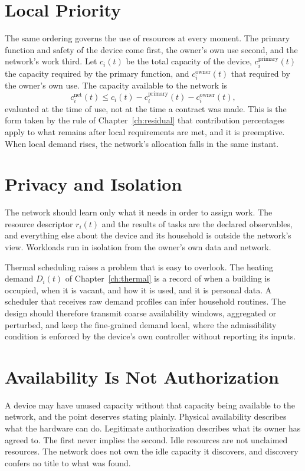 \section{Local Priority}

The same ordering governs the use of resources at every moment. The primary function and safety of the device come first, the owner's own use second, and the network's work third. Let $c_i(t)$ be the total capacity of the device, $c^{\mathrm{primary}}_i(t)$ the capacity required by the primary function, and $c^{\mathrm{owner}}_i(t)$ that required by the owner's own use. The capacity available to the network is
\[
c^{\mathrm{net}}_i(t)\le c_i(t)-c^{\mathrm{primary}}_i(t)-c^{\mathrm{owner}}_i(t),
\]
evaluated at the time of use, not at the time a contract was made. This is the form taken by the rule of Chapter~\ref{ch:residual} that contribution percentages apply to what remains after local requirements are met, and it is preemptive. When local demand rises, the network's allocation falls in the same instant.

\section{Privacy and Isolation}

The network should learn only what it needs in order to assign work. The resource descriptor $r_i(t)$ and the results of tasks are the declared observables, and everything else about the device and its household is outside the network's view. Workloads run in isolation from the owner's own data and network.

Thermal scheduling raises a problem that is easy to overlook. The heating demand $D_i(t)$ of Chapter~\ref{ch:thermal} is a record of when a building is occupied, when it is vacant, and how it is used, and it is personal data. A scheduler that receives raw demand profiles can infer household routines. The design should therefore transmit coarse availability windows, aggregated or perturbed, and keep the fine-grained demand local, where the admissibility condition is enforced by the device's own controller without reporting its inputs.

\section{Availability Is Not Authorization}

A device may have unused capacity without that capacity being available to the network, and the point deserves stating plainly. Physical availability describes what the hardware can do. Legitimate authorization describes what its owner has agreed to. The first never implies the second. Idle resources are not unclaimed resources. The network does not own the idle capacity it discovers, and discovery confers no title to what was found.


